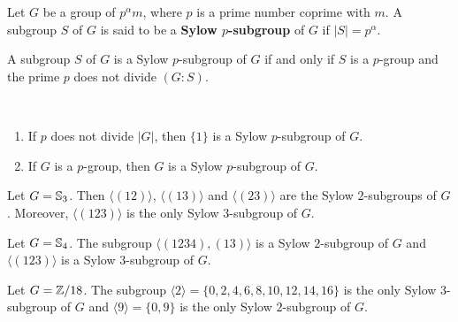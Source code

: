 \chapter{}


\begin{definition}
Let $G$ be a group of $p^\alpha m$, where $p$ is a prime number
coprime with $m$. A subgroup $S$ of $G$ is said to be a \textbf{Sylow $p$-subgroup} of $G$ if $|S|=p^\alpha$.
\end{definition}

A subgroup $S$ of $G$ is a Sylow 
$p$-subgroup of $G$ if and only if $S$ is a $p$-group and
the prime $p$ does not divide $(G:S)$.

\begin{example}\
\begin{enumerate}
\item If $p$ does not divide $|G|$, then $\{1\}$ is a 
Sylow $p$-subgroup of $G$.
\item If $G$ is a $p$-group, then $G$ is a Sylow
$p$-subgroup of $G$.
\end{enumerate}
\end{example}

\begin{example}
Let $G=\mathbb{S}_3$. Then $\langle (12)\rangle$, $\langle (13)\rangle$ and $\langle (23)\rangle$ are the Sylow $2$-subgroups of $G$. Moreover, 
$\langle (123)\rangle$ is the only Sylow $3$-subgroup of $G$.
\end{example}

\begin{example}
Let $G=\mathbb{S}_4$. The subgroup $\langle (1234),(13)\rangle$ is a Sylow $2$-subgroup of $G$ and 
$\langle (123)\rangle$ is a Sylow $3$-subgroup of $G$.
\end{example}

\begin{example}
Let $G=\mathbb{Z}/18$. The subgroup 
$\langle 2\rangle =\{0,2,4,6,8,10,12,14,16\}$ is the only Sylow $3$-subgroup of $G$ and $\langle 9\rangle=\{0,9\}$ is the only
Sylow $2$-subgroup of $G$.
\end{example}

